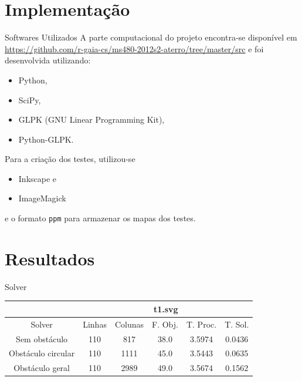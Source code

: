 \documentclass[11pt]{beamer}
\begin{document}
\section{Implementação}
\begin{frame}{Softwares Utilizados}
A parte computacional do projeto encontra-se disponível em
\url{https://github.com/r-gaia-cs/ms480-2012s2-aterro/tree/master/src} e foi
desenvolvida utilizando:
\begin{itemize}
    \item Python\nocite{Python},
    \item SciPy\nocite{SciPy},
    \item GLPK (GNU Linear Programming Kit)\nocite{GLPK},
    \item Python-GLPK.
\end{itemize}
Para a criação dos testes, utilizou-se
\begin{itemize}
    \item Inkscape e
    \item ImageMagick
\end{itemize}
e o formato \texttt{ppm} para armazenar os mapas dos testes.
\end{frame}

\section{Resultados}
\begin{frame}{Solver}
\begin{table}
    \begin{tabular}{|c|c|c|c|c|c|}
        \hline
        & \multicolumn{5}{|c|}{t1.svg} \\ \hline
        Solver & Linhas & Colunas & F. Obj. & T. Proc. & T. Sol. \\ \hline
        Sem obstáculo & 110 & 817 & 38.0 & 3.5974 & 0.0436 \\ \hline
        Obstáculo circular & 110 & 1111 & 45.0 & 3.5443 & 0.0635 \\ \hline
        Obstáculo geral & 110 & 2989 & 49.0 & 3.5674 & 0.1562  \\ \hline
    \end{tabular}
\end{table}
\end{frame}
\end{document}

